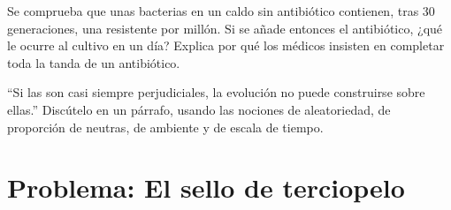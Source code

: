 \begin{exercise}[$\star\star\star$]\label{exo:g11:mutations:14}
Se comprueba que unas bacterias en un caldo sin antibiótico contienen,
tras 30 generaciones, una  resistente por millón. Si se añade
entonces el antibiótico, ¿qué le ocurre al cultivo en un día? Explica
por qué los médicos insisten en completar toda la tanda de un
antibiótico.
\end{exercise}

\begin{exercise}[$\star\star\star$]\label{exo:g11:mutations:15}
``Si las  son casi siempre perjudiciales, la evolución no
puede construirse sobre ellas.'' Discútelo en un párrafo, usando las
nociones de aleatoriedad, de proporción de  neutras, de
ambiente y de escala de tiempo.
\end{exercise}

\section{Problema: El sello de terciopelo}

